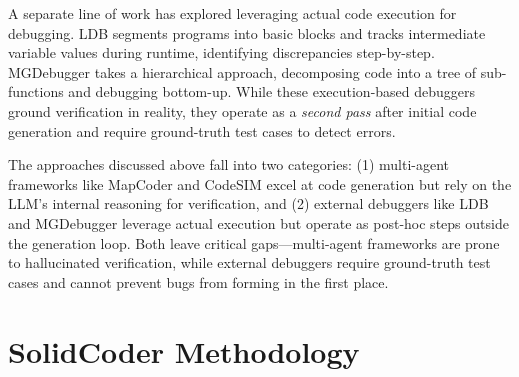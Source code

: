 \documentclass[11pt]{article}
\begin{document}
A separate line of work has explored leveraging actual code execution for debugging. LDB \citep{zhong2024debuglikehumanlarge} segments programs into basic blocks and tracks intermediate variable values during runtime, identifying discrepancies step-by-step. MGDebugger \citep{shi2025codecorrectnessclosingmile} takes a hierarchical approach, decomposing code into a tree of sub-functions and debugging bottom-up. While these execution-based debuggers ground verification in reality, they operate as a \textit{second pass} after initial code generation and require ground-truth test cases to detect errors.

The approaches discussed above fall into two categories: (1) multi-agent frameworks like MapCoder and CodeSIM excel at code generation but rely on the LLM's internal reasoning for verification, and (2) external debuggers like LDB and MGDebugger leverage actual execution but operate as post-hoc steps outside the generation loop. Both leave critical gaps---multi-agent frameworks are prone to hallucinated verification, while external debuggers require ground-truth test cases and cannot prevent bugs from forming in the first place.

\section{SolidCoder Methodology}
\label{sec:methodology}
\end{document}
